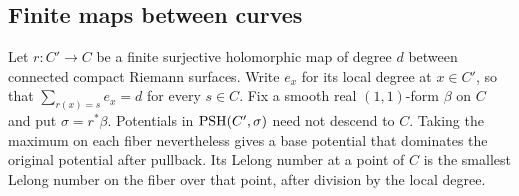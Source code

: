 \subsection{Finite maps between curves}
\label{subsec:finite-curve-potential-operations}

Let $r\colon C'\to C$ be a finite surjective holomorphic map of
degree $d$ between connected compact Riemann surfaces. Write
$e_x$ for its local degree at $x\in C'$, so that
$\sum_{r(x)=s}e_x=d$ for every $s\in C$.
Fix a smooth real $(1,1)$-form $\beta$ on $C$ and put
$\sigma=r^*\beta$.
Potentials in $\mathrm{PSH}(C',\sigma)$ need not descend to $C$.
Taking the maximum on each fiber nevertheless gives a base
potential that dominates the original potential after pullback.
Its Lelong number at a point of $C$ is the smallest Lelong
number on the fiber over that point, after division by the
local degree.

